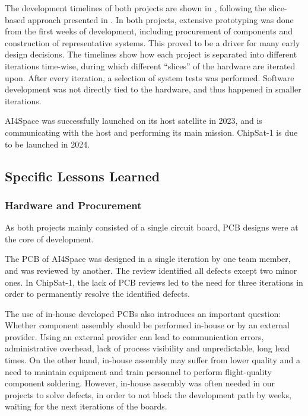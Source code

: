 \documentclass[journal,10pt]{IEEEtran}
\begin{document}
The development timelines of both projects are shown in , following the slice-based approach presented in .
In both projects, extensive prototyping was done from the first weeks of development, including procurement of components and construction of representative systems. This proved to be a driver for many early design decisions.
The timelines show how each project is separated into different iterations time-wise, during which different ``slices'' of the hardware are iterated upon. After every iteration, a selection of system tests was performed. Software development was not directly tied to the hardware, and thus happened in smaller iterations. 




AI4Space was successfully launched on its host satellite in 2023, and is communicating with the host and performing its main mission.
ChipSat-1 is due to be launched in 2024.


\subsection[Specific Lessons Learned]{Specific Lessons Learned}


\subsubsection{Hardware and Procurement}

As both projects mainly consisted of a single circuit board, {\acf{PCB}} designs were at the core of development.

The PCB of AI4Space was designed in a single iteration by one team member, and was reviewed by another. The review identified all defects except two minor ones. In ChipSat-1, the lack of PCB reviews led to the need for three iterations in order to permanently resolve the identified defects.


The use of in-house developed \acsp{PCB} also introduces an important question: Whether component assembly should be performed in-house or by an external provider.
Using an external provider can lead to communication errors, administrative overhead, lack of process visibility and unpredictable, long lead times. On the other hand, in-house assembly may suffer from lower quality and a need to maintain equipment and train personnel to perform flight-quality component soldering. %
However, in-house assembly was often needed in our projects to solve defects, in order to not block the development path by weeks, waiting for the next iterations of the boards. 
\end{document}
